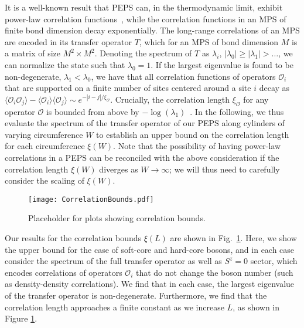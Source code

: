 It is a well-known result that PEPS can, in the thermodynamic limit,
exhibit power-law correlation functions~\cite{?}, while the correlation
functions in an MPS of finite bond dimension decay exponentially. The
long-range correlations of an MPS are encoded in its transfer operator $T$,
which for an MPS of bond dimension $M$ is a matrix of size $M^2 \times M^2$.
Denoting the spectrum of $T$ as $\lambda_i$, $|\lambda_0| \geq |\lambda_1| > \ldots$,
we can normalize the state such that $\lambda_0 = 1$. If the largest eigenvalue
is found to be non-degenerate, $\lambda_1 < \lambda_0$, we have that all correlation
functions of operators $\mathcal{O}_i$ that are supported on a finite number of sites centered
around a site $i$ decay as
$\langle \mathcal{O}_i \mathcal{O}_j \rangle - \langle \mathcal{O}_i \rangle \langle \mathcal{O}_j \rangle \sim e^{-|i-j|/\xi_\mathcal{O}}$.
Crucially, the correlation length $\xi_\mathcal{O}$ for any operator $\mathcal{O}$
is bounded from above by $-\log(\lambda_1)$~\cite{?}. In the following, we thus
evaluate the spectrum of the transfer operator of our PEPS along cylinders of varying
circumference $W$ to establish an upper bound on the correlation length for each
circumference $\xi(W)$.
Note that the possibility of having power-law correlations in a PEPS can
be reconciled with the above consideration if the correlation length $\xi(W)$
diverges as $W \rightarrow \infty$; we will thus need to carefully consider the scaling
of $\xi(W)$.

\begin{figure}[hbtc]
	\centering
	\texttt{[image: CorrelationBounds.pdf]}
	\caption{Placeholder for plots showing correlation bounds.}
	\label{fig:TMS}
\end{figure}

Our results for the correlation bounds $\xi(L)$ are shown in Fig.~\ref{fig:TMS}.
Here, we show the upper bound for the case of soft-core and hard-core bosons,
and in each case consider the spectrum of the full transfer operator as well
as $S^z=0$ sector, which encodes correlations of operators $\mathcal{O}_i$ that do not
change the boson number (such as density-density correlations).
We find that in each case, the largest eigenvalue of the transfer operator is
non-degenerate. Furthermore, we find
that the correlation length approaches a finite constant as we
increase $L$, as shown in Figure \ref{fig:TMS}.
